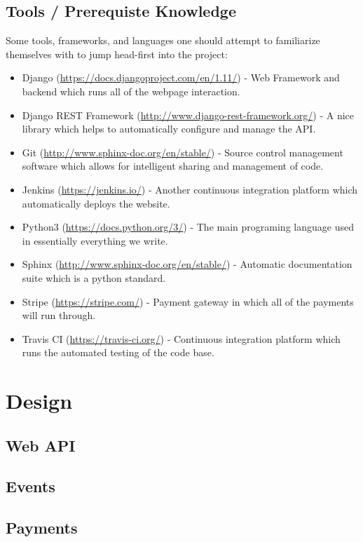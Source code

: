\documentclass{article}
\begin{document}
\subsection{Tools / Prerequiste Knowledge}
Some tools, frameworks, and languages one should attempt to familiarize 
themselves with to jump head-first into the project:
\begin{itemize}
    \item Django (\url{https://docs.djangoproject.com/en/1.11/}) - Web 
          Framework and backend which runs all of the webpage interaction.
    \item Django REST Framework (\url{http://www.django-rest-framework.org/}) -
          A nice library which helps to automatically configure and manage the
          API.
    \item Git (\url{http://www.sphinx-doc.org/en/stable/}) - Source control
          management software which allows for intelligent sharing and
          management of code.
    \item Jenkins (\url{https://jenkins.io/}) - Another continuous
          integration platform which automatically deploys the website.
    \item Python3 (\url{https://docs.python.org/3/}) - The main programing
          language used in essentially everything we write.
    \item Sphinx (\url{http://www.sphinx-doc.org/en/stable/}) - Automatic
          documentation suite which is a python standard.
    \item Stripe (\url{https://stripe.com/}) - Payment gateway in which all of
          the payments will run through.
    \item Travis CI (\url{https://travis-ci.org/}) - Continuous integration
          platform which runs the automated testing of the code base.
\end{itemize}

\section{Design}
\subsection{Web API}
\subsection{Events}
\subsection{Payments}
\end{document}

